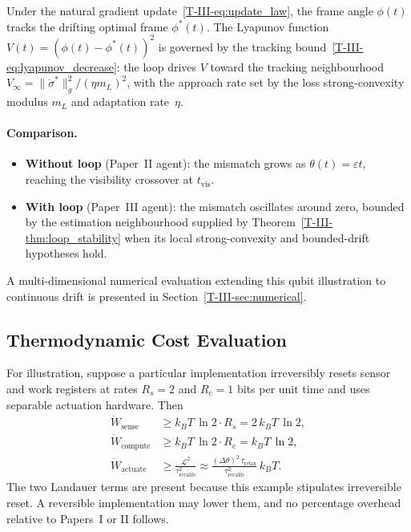 \documentclass[12pt,a4paper,openany]{book}
\begin{document}
Under the natural gradient
update~\eqref{T-III-eq:update_law}, the frame angle
$\phi(t)$ tracks the drifting optimal frame
$\phi^*(t)$.
The Lyapunov function
$V(t) = (\phi(t) - \phi^*(t))^2$ is governed by the
tracking bound~\eqref{T-III-eq:lyapunov_decrease}:
the loop drives $V$ toward the tracking neighbourhood
$V_\infty = \|\dot{\sigma}^*\|_g^2/(\eta m_L)^2$,
with the approach rate set by the loss strong-convexity modulus $m_L$
and adaptation rate~$\eta$.

\paragraph{Comparison.}
\begin{itemize}
\item \textbf{Without loop} (Paper~II agent): the mismatch
  grows as $\theta(t)=\varepsilon t$, reaching the visibility
  crossover at $t_{\mathrm{vis}}$.
\item \textbf{With loop} (Paper~III agent): the mismatch
  oscillates around zero, bounded by the estimation
  neighbourhood supplied by Theorem~\ref{T-III-thm:loop_stability} when its
  local strong-convexity and bounded-drift hypotheses hold.
\end{itemize}

A multi-dimensional numerical evaluation extending
this qubit illustration to continuous drift is presented
in Section~\ref{T-III-sec:numerical}.

\subsection{Thermodynamic Cost Evaluation}
\label{T-III-subsec:cost_eval}

For illustration, suppose a particular implementation irreversibly
resets sensor and work registers at rates $R_s=2$ and $R_c=1$ bits per
unit time and uses separable actuation hardware.  Then
\begin{align}
\dot{W}_{\mathrm{sense}}
&\geq k_BT\,\ln 2 \cdot R_s
= 2\,k_BT\,\ln 2, \label{T-III-eq:cost_sense_ex} \\
\dot{W}_{\mathrm{compute}}
&\geq k_BT\,\ln 2 \cdot R_c
= k_BT\,\ln 2, \label{T-III-eq:cost_compute_ex} \\
\dot{W}_{\mathrm{actuate}}
&\geq \frac{\mathcal{L}^2}{\tau_{\mathrm{recalib}}^2}
\approx \frac{(\Delta\theta)^2\,\tau_{\mathrm{relax}}}
  {\tau_{\mathrm{recalib}}^2}\,k_BT.
  \label{T-III-eq:cost_actuate_ex}
\end{align}
The two Landauer terms are present because this example stipulates
irreversible reset.  A reversible implementation may lower them, and
no percentage overhead relative to Papers~I or II follows.
\end{document}
